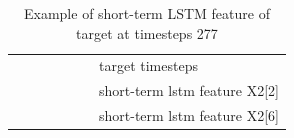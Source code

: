 \begin{table}[]
\begin{tabular}{llllllllllll}
                                                      &                                                  &                                                  &                                                &                                                  & \cellcolor[HTML]{34FF34}                         & \multicolumn{6}{l}{target timesteps}                                                                                                                                                                                                                                                                             \\
                                                      &                                                  &                                                  &                                                &                                                  & \cellcolor[HTML]{FFFFC7}                         & \multicolumn{6}{l}{short-term lstm feature X2{[}2{]}}                                                                                                                                                                                                                                                           \\
                                                      &                                                  &                                                  &                                                &                                                  & \cellcolor[HTML]{F8FF00}                         & \multicolumn{6}{l}{short-term lstm feature X2{[}6{]}}                                                                                                                                                                                                                                                          
    \end{tabular}
    \caption{Example of short-term LSTM feature of target at timesteps 277}
    \label{tab:Example-short-term-LSTM}
    \end{table}

